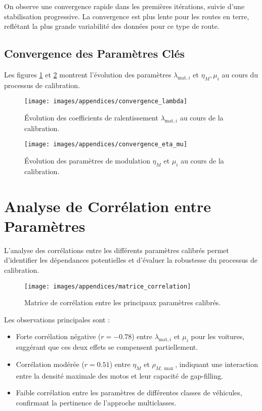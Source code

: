 On observe une convergence rapide dans les premières itérations, suivie d'une stabilisation progressive. La convergence est plus lente pour les routes en terre, reflétant la plus grande variabilité des données pour ce type de route.

\subsection{Convergence des Paramètres Clés}
\label{subsec:convergence_parametres}

Les figures \ref{fig:convergence_lambda} et \ref{fig:convergence_eta_mu} montrent l'évolution des paramètres $\lambda_{\text{mat},i}$ et $\eta_M, \mu_i$ au cours du processus de calibration.

\begin{figure}[htbp]
\centering
\texttt{[image: images/appendices/convergence\_lambda]}
\caption{Évolution des coefficients de ralentissement $\lambda_{\text{mat},i}$ au cours de la calibration.}
\label{fig:convergence_lambda}
\end{figure}

\begin{figure}[htbp]
\centering
\texttt{[image: images/appendices/convergence\_eta\_mu]}
\caption{Évolution des paramètres de modulation $\eta_M$ et $\mu_i$ au cours de la calibration.}
\label{fig:convergence_eta_mu}
\end{figure}

\section{Analyse de Corrélation entre Paramètres}
\label{sec:correlation_parametres}

L'analyse des corrélations entre les différents paramètres calibrés permet d'identifier les dépendances potentielles et d'évaluer la robustesse du processus de calibration.

\begin{figure}[htbp]
\centering
\texttt{[image: images/appendices/matrice\_correlation]}
\caption{Matrice de corrélation entre les principaux paramètres calibrés.}
\label{fig:matrice_correlation}
\end{figure}

Les observations principales sont :
\begin{itemize}
\item Forte corrélation négative ($r = -0.78$) entre $\lambda_{\text{mat},i}$ et $\mu_i$ pour les voitures, suggérant que ces deux effets se compensent partiellement.
\item Corrélation modérée ($r = 0.51$) entre $\eta_M$ et $\rho_{M,\max}$, indiquant une interaction entre la densité maximale des motos et leur capacité de gap-filling.
\item Faible corrélation entre les paramètres de différentes classes de véhicules, confirmant la pertinence de l'approche multiclasses.
\end{itemize}

